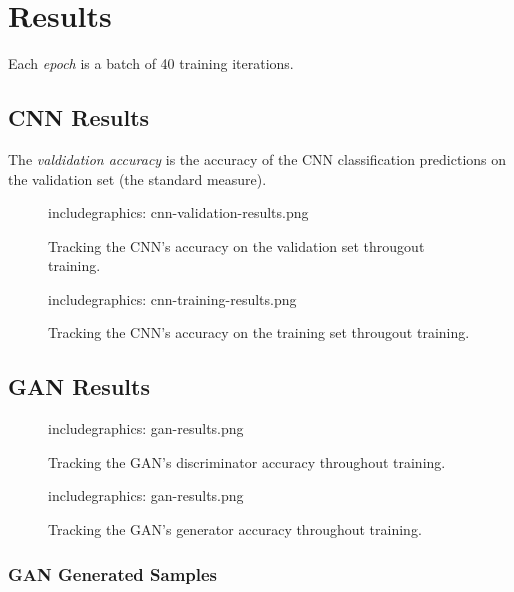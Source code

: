 \documentclass{article}
\renewcommand{\it}{\textit}
\newcommand{\tmpincludegraphics}[1][opt]{includegraphics: }
\begin{document}
\newpage
\restoregeometry
\pagestyle{plain}
\section{Results}

Each \it{epoch} is a batch of 40 training iterations.

\subsection{CNN Results}

The \it{valdidation accuracy} is the accuracy of the CNN classification predictions on the validation set (the standard measure).

\begin{figure}[ht]
\label{fig:cnn-validation-results}
\centering
\tmpincludegraphics[width=\textwidth]{cnn-validation-results.png}
\caption{Tracking the CNN's accuracy on the validation set througout training.}
\end{figure}

\begin{figure}[ht]
\label{fig:cnn-training-results}
\centering
\tmpincludegraphics[width=\textwidth]{cnn-training-results.png}
\caption{Tracking the CNN's accuracy on the training set througout training.}
\end{figure}

\newpage

\subsection{GAN Results}

\begin{figure}[ht]
\label{fig:gan-discriminator-results}
\centering
\tmpincludegraphics[width=\textwidth]{gan-results.png}
\caption{Tracking the GAN's discriminator accuracy throughout training.}
\end{figure}

\begin{figure}[ht]
\label{fig:gan-generator-results}
\centering
\tmpincludegraphics[width=\textwidth]{gan-results.png}
\caption{Tracking the GAN's generator accuracy throughout training.}
\end{figure}

\subsubsection{GAN Generated Samples}
\end{document}
